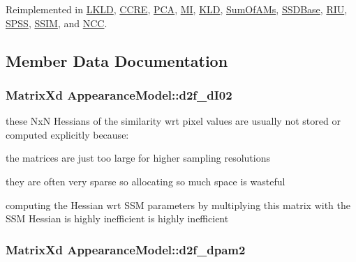 Reimplemented in \hyperlink{classLKLD_ad664366d84f9734dc98217f9018be72e}{L\-K\-L\-D}, \hyperlink{classCCRE_a88f2514eb41b3a38278cca83c1b884dd}{C\-C\-R\-E}, \hyperlink{classPCA_a44e03ba4301d9a8b4ba1dadf85b05358}{P\-C\-A}, \hyperlink{classMI_a9d4a0ea761a2576fff6db5e33e41510b}{M\-I}, \hyperlink{classKLD_a303fabab01458afed9364cca944eb028}{K\-L\-D}, \hyperlink{classSumOfAMs_a423959086abd982ee56c055567f6522c}{Sum\-Of\-A\-Ms}, \hyperlink{classSSDBase_abc7ddc50c9f32bbf1a5b7da932d006cf}{S\-S\-D\-Base}, \hyperlink{classRIU_a321095af97c9e2862a099ea1293ad676}{R\-I\-U}, \hyperlink{classSPSS_a1a7a1a7cfce732222c3128f105e58bd3}{S\-P\-S\-S}, \hyperlink{classSSIM_a4f621ff32d95ef9d1f62cccf4cffe881}{S\-S\-I\-M}, and \hyperlink{classNCC_ad230e363657b023a80984543788a42e0}{N\-C\-C}.



\subsection{Member Data Documentation}
\hypertarget{classAppearanceModel_a398fcc79cc79b42ecc789084dd1a4b8a}{
\subsubsection[{d2f\-\_\-d\-I02}]{\setlength{\rightskip}{0pt plus 5cm}Matrix\-Xd Appearance\-Model\-::d2f\-\_\-d\-I02\hspace{0.3cm}{\ttfamily [protected]}}}\label{classAppearanceModel_a398fcc79cc79b42ecc789084dd1a4b8a}


these Nx\-N Hessians of the similarity wrt pixel values are usually not stored or computed explicitly because\-: 


\begin{DoxyEnumerate}
\item the matrices are just too large for higher sampling resolutions
\item they are often very sparse so allocating so much space is wasteful
\item computing the Hessian wrt S\-S\-M parameters by multiplying this matrix with the S\-S\-M Hessian is highly inefficient is highly inefficient 
\end{DoxyEnumerate}\hypertarget{classAppearanceModel_adf79d9809d4ba3fec3d8ac84fc80fe59}{
\subsubsection[{d2f\-\_\-dpam2}]{\setlength{\rightskip}{0pt plus 5cm}Matrix\-Xd Appearance\-Model\-::d2f\-\_\-dpam2\hspace{0.3cm}{\ttfamily [protected]}}}\label{classAppearanceModel_adf79d9809d4ba3fec3d8ac84fc80fe59}


